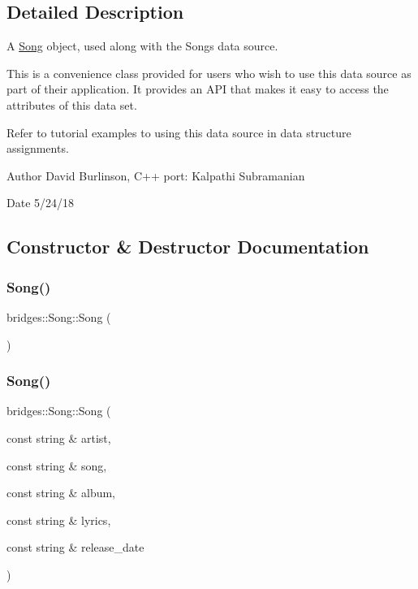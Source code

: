 \subsection{Detailed Description}
A \mbox{\hyperlink{classbridges_1_1_song}{Song}} object, used along with the Songs data source. 

This is a convenience class provided for users who wish to use this data source as part of their application. It provides an A\+PI that makes it easy to access the attributes of this data set.

Refer to tutorial examples to using this data source in data structure assignments.

\begin{DoxyAuthor}{Author}
David Burlinson, C++ port\+: Kalpathi Subramanian 
\end{DoxyAuthor}
\begin{DoxyDate}{Date}
5/24/18 
\end{DoxyDate}


\subsection{Constructor \& Destructor Documentation}
\mbox{\label{classbridges_1_1_song_aa938ae0bd6d566d6e2a6bf30beeb0ea5}} 
\subsubsection{\texorpdfstring{Song()}{Song()}\hspace{0.1cm}{\footnotesize\ttfamily [1/2]}}
{\footnotesize\ttfamily bridges\+::\+Song\+::\+Song (\begin{DoxyParamCaption}{ }\end{DoxyParamCaption})\hspace{0.3cm}{\ttfamily [inline]}}

\mbox{\label{classbridges_1_1_song_a6bba7d1a1ce20a34b30cfa1cd874faa0}} 
\subsubsection{\texorpdfstring{Song()}{Song()}\hspace{0.1cm}{\footnotesize\ttfamily [2/2]}}
{\footnotesize\ttfamily bridges\+::\+Song\+::\+Song (\begin{DoxyParamCaption}\item[{const string \&}]{artist,  }\item[{const string \&}]{song,  }\item[{const string \&}]{album,  }\item[{const string \&}]{lyrics,  }\item[{const string \&}]{release\+\_\+date }\end{DoxyParamCaption})\hspace{0.3cm}{\ttfamily [inline]}}




